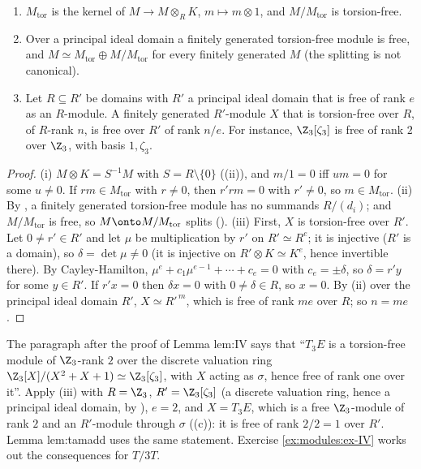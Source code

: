 \begin{proposition}\label{prop:modules:torsion}
\begin{enumerate}[label=(\roman*)]
\item $M_{\mathrm{tor}}$ is the kernel of $M\to M\otimes_RK$, $m\mapsto m\otimes1$, and $M/M_{\mathrm{tor}}$ is torsion-free.
\item Over a principal ideal domain a finitely generated torsion-free module is free, and $M\simeq M_{\mathrm{tor}}\oplus M/M_{\mathrm{tor}}$ for every
finitely generated $M$ (the splitting is not canonical).
\item Let $R\subseteq R'$ be domains with $R'$ a principal ideal domain that is free of rank $e$ as an $R$-module. A finitely generated
$R'$-module $X$ that is torsion-free over $R$, of $R$-rank $n$, is free over $R'$ of rank $n/e$. For instance, $\Z_3[\zeta_3]$ is free of
rank $2$ over $\Z_3$, with basis $1,\zeta_3$.
\end{enumerate}
\end{proposition}

\begin{proof}
(i) $M\otimes K=S^{-1}M$ with $S=R\setminus\{0\}$ ((ii)), and $m/1=0$ iff $um=0$ for some $u\ne0$. If $rm\in M_{\mathrm{tor}}$
with $r\ne0$, then $r'rm=0$ with $r'\ne0$, so $m\in M_{\mathrm{tor}}$.
(ii) By , a finitely generated torsion-free module has no summands $R/(d_i)$; and $M/M_{\mathrm{tor}}$ is free, so
$M\onto M/M_{\mathrm{tor}}$ splits ().
(iii) First, $X$ is torsion-free over $R'$. Let $0\ne r'\in R'$ and let $\mu$ be multiplication by $r'$ on $R'\simeq R^e$; it is
injective ($R'$ is a domain), so $\delta=\det\mu\ne0$ (it is injective on $R'\otimes K\simeq K^e$, hence invertible there). By
Cayley-Hamilton, $\mu^e+c_1\mu^{e-1}+\cdots+c_e=0$ with $c_e=\pm\delta$, so $\delta=r'y$ for some $y\in R'$. If $r'x=0$ then $\delta x=0$ with
$0\ne\delta\in R$, so $x=0$. By (ii) over the principal ideal domain $R'$, $X\simeq R'^{\,m}$, which is free of rank $me$ over $R$; so $n=me$.
\end{proof}

\begin{paperlink}\label{pl:modules:IV}
The paragraph after the proof of Lemma lem:IV says that ``$T_3E$ is a torsion-free module of $\Z_3$-rank $2$ over the discrete valuation ring
$\Z_3[X]/(X^2+X+1)\simeq\Z_3[\zeta_3]$, with $X$ acting as $\sigma$, hence free of rank one over it''. Apply (iii) with $R=\Z_3$, $R'=\Z_3[\zeta_3]$ (a discrete valuation ring, hence a principal ideal
domain, by ), $e=2$, and $X=T_3E$, which is a free $\Z_3$-module of rank $2$ and an $R'$-module through $\sigma$
((c)): it is free of rank $2/2=1$ over $R'$. Lemma lem:tamadd uses the same statement. Exercise
\ref{ex:modules:ex-IV} works out the consequences for $T/3T$.
\end{paperlink}


